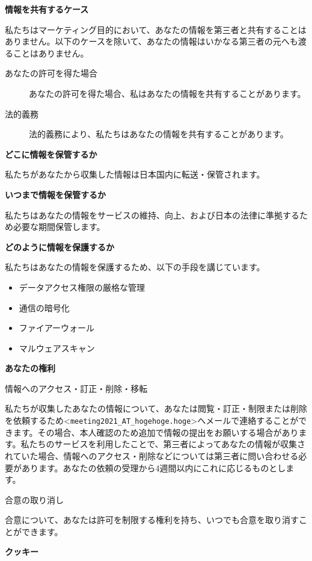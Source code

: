 \documentclass[titlepage,10pt,a4paper,uplatex]{jsbook}
\newenvironment{content}{\begin{shaded}\vspace{-1em}\raggedright\ttfamily\footnotesize\setlength{\baselineskip}{1.4em}}{\end{shaded}\vspace{-1em}}
\renewcommand{\textbf}[1]{{\bfseries\sffamily#1}}
\begin{document}
\begin{content}
\textbf{\Large 情報を共有するケース}

私たちはマーケティング目的において、あなたの情報を第三者と共有することはありません。以下のケースを除いて、あなたの情報はいかなる第三者の元へも渡ることはありません。

\begin{description}
\item[あなたの許可を得た場合] あなたの許可を得た場合、私はあなたの情報を共有することがあります。
\item[法的義務] 法的義務により、私たちはあなたの情報を共有することがあります。
\end{description}

\textbf{\Large どこに情報を保管するか}

私たちがあなたから収集した情報は日本国内に転送・保管されます。

\textbf{\Large いつまで情報を保管するか}

私たちはあなたの情報をサービスの維持、向上、および日本の法律に準拠するため必要な期間保管します。

\textbf{\Large どのように情報を保護するか}

私たちはあなたの情報を保護するため、以下の手段を講じています。

\begin{itemize}
\item データアクセス権限の厳格な管理
\item 通信の暗号化
\item ファイアーウォール
\item マルウェアスキャン
\end{itemize}

\textbf{\Large あなたの権利}

{\Large 情報へのアクセス・訂正・削除・移転}

私たちが収集したあなたの情報について、あなたは閲覧・訂正・制限または削除を依頼するため{\textless}\texttt{meeting2021\_AT\_hogehoge.hoge}{\textgreater}へメールで連絡することができます。その場合、本人確認のため追加で情報の提出をお願いする場合があります。私たちのサービスを利用したことで、第三者によってあなたの情報が収集されていた場合、情報へのアクセス・削除などについては第三者に問い合わせる必要があります。あなたの依頼の受理から4週間以内にこれに応じるものとします。

{\Large 合意の取り消し}

合意について、あなたは許可を制限する権利を持ち、いつでも合意を取り消すことができます。

\textbf{\Large クッキー}


\end{content}
\end{document}
